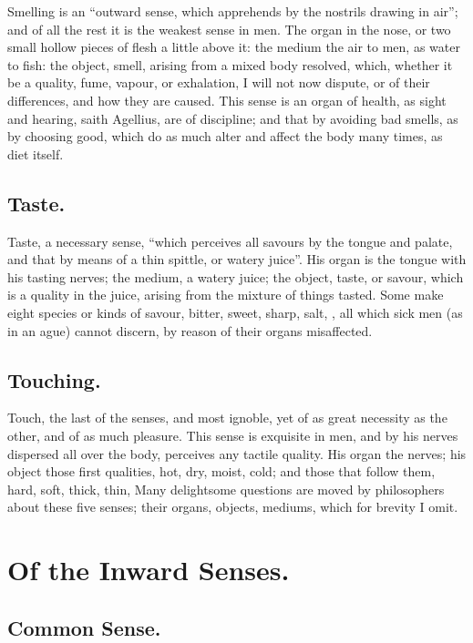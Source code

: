 Smelling is an \enquote{outward sense, which apprehends by the nostrils drawing in
air}; and of all the rest it is the weakest sense in men. The organ in the
nose, or two small hollow pieces of flesh a little above it: the medium the air
to men, as water to fish: the object, smell, arising from a mixed body
resolved, which, whether it be a quality, fume, vapour, or exhalation, I will
not now dispute, or of their differences, and how they are caused. This sense
is an organ of health, as sight and hearing, saith
Agellius, are of discipline; and that by avoiding bad
smells, as by choosing good, which do as much alter and affect the body many
times, as diet itself.

\subsection{Taste.}

Taste, a necessary sense, \enquote{which perceives all savours by the tongue and
palate, and that by means of a thin spittle, or watery juice}. His organ is the
tongue with his tasting nerves; the medium, a watery juice; the object, taste,
or savour, which is a quality in the juice, arising from the mixture of things
tasted. Some make eight species or kinds of savour, bitter, sweet, sharp, salt,
\etc{}, all which sick men (as in an ague) cannot discern, by reason of their
organs misaffected.

\subsection{Touching.}

Touch, the last of the senses, and most ignoble, yet of as great necessity as
the other, and of as much pleasure. This sense is exquisite in men, and by his
nerves dispersed all over the body, perceives any tactile quality. His organ
the nerves; his object those first qualities, hot, dry, moist, cold; and those
that follow them, hard, soft, thick, thin, \etc{} Many delightsome questions
are moved by philosophers about these five senses; their organs, objects,
mediums, which for brevity I omit.

\section{Of the Inward Senses.}

\subsection{Common Sense.}

